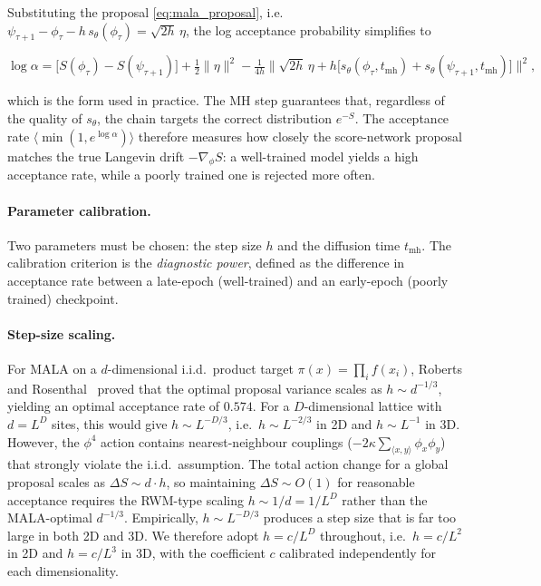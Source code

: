 \documentclass[reprint,twocolumn,superscriptaddress,preprintnumbers,amsmath,amssymb,aps,prd,floatfix]{revtex4-2}
\def\eq#1{\eqref{#1}}
\begin{document}
Substituting the proposal \eq{eq:mala_proposal}, i.e.\ $\psi_{\tau+1}-\phi_\tau - h\,s_\theta(\phi_\tau) = \sqrt{2h}\,\eta$, the log acceptance probability simplifies to
\begin{widetext}
\begin{equation}
\log\alpha = \bigl[S(\phi_\tau)-S(\psi_{\tau+1})\bigr]
+ \tfrac{1}{2}\|\eta\|^2
- \tfrac{1}{4h}\bigl\|\sqrt{2h}\,\eta + h\bigl[s_\theta(\phi_\tau,t_{\text{mh}})+s_\theta(\psi_{\tau+1},t_{\text{mh}})\bigr]\bigr\|^2,
\label{eq:mala_logalpha}
\end{equation}
\end{widetext}
which is the form used in practice. The MH step guarantees that, regardless of the quality of $s_\theta$, the chain targets the correct distribution $e^{-S}$. The acceptance rate $\langle\min(1,e^{\log\alpha})\rangle$ therefore measures how closely the score-network proposal matches the true Langevin drift $-\nabla_\phi S$: a well-trained model yields a high acceptance rate, while a poorly trained one is rejected more often.

\paragraph{Parameter calibration.}
Two parameters must be chosen: the step size $h$ and the diffusion time $t_{\text{mh}}$. The calibration criterion is the \emph{diagnostic power}, defined as the difference in acceptance rate between a late-epoch (well-trained) and an early-epoch (poorly trained) checkpoint.

\paragraph{Step-size scaling.}
For MALA on a $d$-dimensional i.i.d.\ product target $\pi(x)=\prod_i f(x_i)$, Roberts and Rosenthal~\cite{Roberts1998} proved that the optimal proposal variance scales as $h\sim d^{-1/3}$, yielding an optimal acceptance rate of $0.574$. For a $D$-dimensional lattice with $d=L^D$ sites, this would give $h\sim L^{-D/3}$, i.e.\ $h\sim L^{-2/3}$ in 2D and $h\sim L^{-1}$ in 3D. However, the $\phi^4$ action contains nearest-neighbour couplings ($-2\kappa\sum_{\langle x,y\rangle}\phi_x\phi_y$) that strongly violate the i.i.d.\ assumption. The total action change for a global proposal scales as $\Delta S \sim d\cdot h$, so maintaining $\Delta S\sim O(1)$ for reasonable acceptance requires the RWM-type scaling $h\sim 1/d = 1/L^D$ rather than the MALA-optimal $d^{-1/3}$. Empirically, $h\sim L^{-D/3}$ produces a step size that is far too large in both 2D and 3D. We therefore adopt $h=c/L^D$ throughout, i.e.\ $h=c/L^2$ in 2D and $h=c/L^3$ in 3D, with the coefficient $c$ calibrated independently for each dimensionality.
\end{document}
